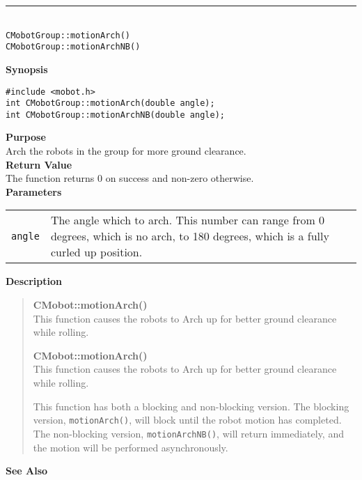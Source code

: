 \noindent
\vspace{5pt}
\rule{4.5in}{0.015in}\\
\noindent
{\LARGE \texttt{CMobotGroup::motionArch()}}\\
{\LARGE \texttt{CMobotGroup::motionArchNB()}}\\
{}

\noindent
{\bf Synopsis}
\vspace{-8pt}
\begin{verbatim}
#include <mobot.h>
int CMobotGroup::motionArch(double angle);
int CMobotGroup::motionArchNB(double angle);
\end{verbatim}

\noindent
{\bf Purpose}\\
Arch the robots in the group for more ground clearance.\\

\noindent
{\bf Return Value}\\
The function returns 0 on success and non-zero otherwise.\\

\noindent
{\bf Parameters}\\
\vspace{-0.1in}
\begin{description}
\item               
\begin{tabular}{p{10 mm}p{145 mm}}
\texttt{angle} & The angle which to arch. This number can range from 0 degrees, which is
no arch, to 180 degrees, which is a fully curled up position.\\
\end{tabular}
\end{description}

\noindent
{\bf Description}\\
\vspace{-12pt}
\begin{quote}
{\bf CMobot::motionArch()}\\
This function causes the robots to Arch up for better ground clearance while 
rolling.

{\bf CMobot::motionArch()}\\
This function causes the robots to Arch up for better ground clearance while 
rolling.

This function has both a blocking and non-blocking version.
The blocking version, \texttt{motionArch()}, will block until the
robot motion has completed. The non-blocking version, \texttt{motionArchNB()},
will return immediately, and the motion will be performed asynchronously.\\
\end{quote}

\noindent
{\bf See Also}\\

